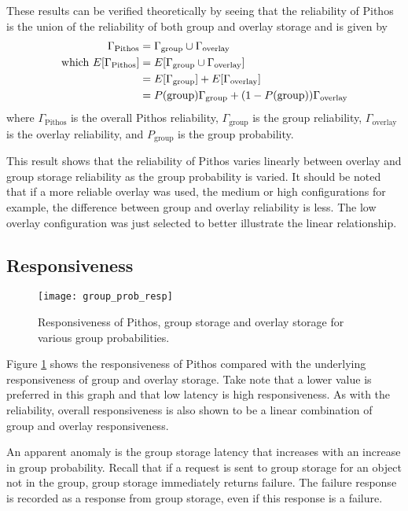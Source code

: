 These results can be verified theoretically by seeing that the reliability of Pithos is the union of the reliability of both group and overlay storage and is given by
%
\begin{align}
     \Gamma_{\textrm{Pithos}}& = \Gamma_{\textrm{group}} \cup \Gamma_{\textrm{overlay}} \\
     \textrm{which }
  E[\Gamma_{\textrm{Pithos}}]& = E[\Gamma_{\textrm{group}} \cup \Gamma_{\textrm{overlay}}] \notag \\
                             & = E[\Gamma_{\textrm{group}}] + E[\Gamma_{\textrm{overlay}}] \notag \\
                             & = P(\textrm{group})\Gamma_{\textrm{group}} + (1-P(\textrm{group}))\Gamma_{\textrm{overlay}}
\end{align}
%
where $\Gamma_{\textrm{Pithos}}$ is the overall Pithos reliability, $\Gamma_{\textrm{group}}$ is the group reliability, $\Gamma_{\textrm{overlay}}$ is the overlay reliability, and $P_{\textrm{group}}$ is the group probability.

This result shows that the reliability of Pithos varies linearly between overlay and group storage reliability as the group probability is varied. It should be noted that if a more reliable overlay was used, the medium or high configurations for example, the difference between group and overlay reliability is less. The low overlay configuration was just selected to better illustrate the linear relationship.

\subsection{Responsiveness}

\begin{figure}[htbp]
 \centering
 \texttt{[image: group\_prob\_resp]}
 \caption{Responsiveness of Pithos, group storage and overlay storage for various group probabilities.}
 \label{fig_group_prob_resp}
\end{figure}
%
Figure \ref{fig_group_prob_resp} shows the responsiveness of Pithos compared with the underlying responsiveness of group and overlay storage. Take note that a lower value is preferred in this graph and that low latency is high responsiveness. As with the reliability, overall responsiveness is also shown to be a linear combination of group and overlay responsiveness.

An apparent anomaly is the group storage latency that increases with an increase in group probability. Recall that if a request is sent to group storage for an object not in the group, group storage immediately returns failure. The failure response is recorded as a response from group storage, even if this response is a failure.

